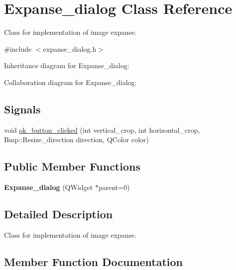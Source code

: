 \hypertarget{classExpanse__dialog}{}\section{Expanse\+\_\+dialog Class Reference}
\label{classExpanse__dialog}


Class for implementation of image expanse.  




{\ttfamily \#include $<$expanse\+\_\+dialog.\+h$>$}



Inheritance diagram for Expanse\+\_\+dialog\+:


Collaboration diagram for Expanse\+\_\+dialog\+:
\subsection*{Signals}
\begin{DoxyCompactItemize}
\item 
void \hyperlink{classExpanse__dialog_ae875af004a8f297424754da6f16f215a}{ok\+\_\+button\+\_\+clicked} (int vertical\+\_\+crop, int horizontal\+\_\+crop, Bmp\+::\+Resize\+\_\+direction direction, Q\+Color color)
\end{DoxyCompactItemize}
\subsection*{Public Member Functions}
\begin{DoxyCompactItemize}
\item 
{\bfseries Expanse\+\_\+dialog} (Q\+Widget $\ast$parent=0)\hypertarget{classExpanse__dialog_a10b7860ad73d1d2c0ba3ef80d27524a1}{}\label{classExpanse__dialog_a10b7860ad73d1d2c0ba3ef80d27524a1}

\end{DoxyCompactItemize}


\subsection{Detailed Description}
Class for implementation of image expanse. 

\subsection{Member Function Documentation}
